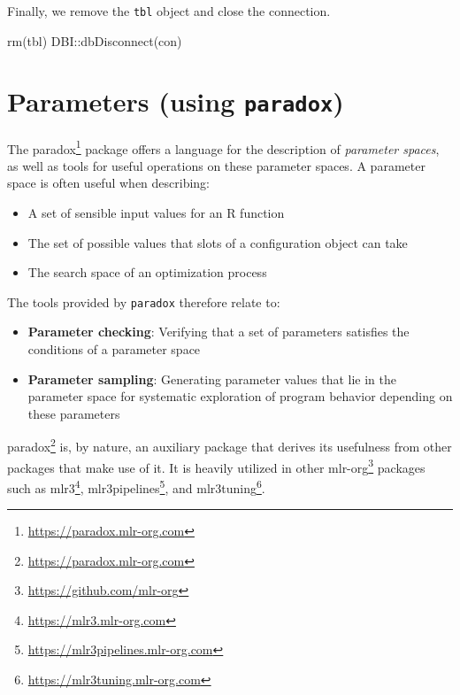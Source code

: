 \documentclass[12pt,]{scrbook}
\newenvironment{Shaded}{}{}
\newcommand{\KeywordTok}[1]{\textcolor[rgb]{0.00,0.00,1.00}{#1}}
\newcommand{\NormalTok}[1]{#1}
\newcommand{\OperatorTok}[1]{#1}
\providecommand{\tightlist}{%
  \setlength{\itemsep}{0pt}\setlength{\parskip}{0pt}}
\renewcommand{\href}[2]{#2\footnote{\url{#1}}}
\begin{document}
Finally, we remove the \texttt{tbl} object and close the connection.

\begin{Shaded}
\begin{Highlighting}[]
\KeywordTok{rm}\NormalTok{(tbl)}
\NormalTok{DBI}\OperatorTok{::}\KeywordTok{dbDisconnect}\NormalTok{(con)}
\end{Highlighting}
\end{Shaded}

\hypertarget{paradox}{%
\section{\texorpdfstring{Parameters (using \texttt{paradox})}{Parameters (using paradox)}}\label{paradox}}

The \href{https://paradox.mlr-org.com}{paradox} package offers a language for the description of \emph{parameter spaces}, as well as tools for useful operations on these parameter spaces.
A parameter space is often useful when describing:

\begin{itemize}
\tightlist
\item
  A set of sensible input values for an R function
\item
  The set of possible values that slots of a configuration object can take
\item
  The search space of an optimization process
\end{itemize}

The tools provided by \texttt{paradox} therefore relate to:

\begin{itemize}
\tightlist
\item
  \textbf{Parameter checking}: Verifying that a set of parameters satisfies the conditions of a parameter space
\item
  \textbf{Parameter sampling}: Generating parameter values that lie in the parameter space for systematic exploration of program behavior depending on these parameters
\end{itemize}

\href{https://paradox.mlr-org.com}{paradox} is, by nature, an auxiliary package that derives its usefulness from other packages that make use of it.
It is heavily utilized in other \href{https://github.com/mlr-org}{mlr-org} packages such as \href{https://mlr3.mlr-org.com}{mlr3}, \href{https://mlr3pipelines.mlr-org.com}{mlr3pipelines}, and \href{https://mlr3tuning.mlr-org.com}{mlr3tuning}.
\end{document}
